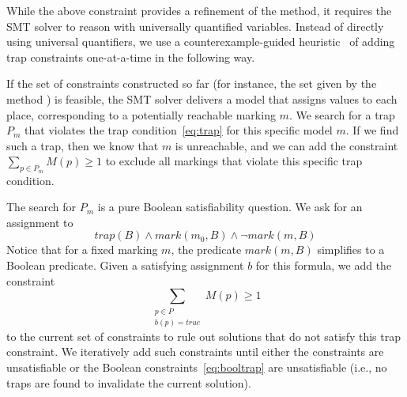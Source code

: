 While the above constraint provides a refinement of the \safety{} method, it
requires the SMT solver to reason with universally quantified variables.
Instead of directly using universal quantifiers, we use a counterexample-guided
heuristic~\cite{EsparzaMelzer00,Solar-LezamaTBSS06} of adding trap constraints one-at-a-time in
the following way.

If the set of constraints constructed so far (for instance, the set
given by the method \safety) is feasible, the SMT solver delivers a
model that assigns values to each place, corresponding to a potentially reachable marking $m$.  
We search for a trap $P_m$ that violates the trap condition~\eqref{eq:trap} for this specific model $m$.
If we find such a trap, then we know that $m$ is unreachable, and we can
add the constraint $\sum_{p \in P_m} M(p) \geq 1$ to exclude all markings that violate
this specific trap condition.

The search for $P_m$ is a pure Boolean satisfiability question.
We ask for an assignment to 
\begin{equation}\label{eq:booltrap}
\mathit{trap}(B) \wedge \mathit{mark}(m_0,B) \wedge \lnot \mathit{mark}(m, B)
\end{equation}
Notice that for a fixed marking $m$, the predicate $\mathit{mark}(m,B)$ simplifies
to a Boolean predicate.
Given a satisfying assignment $b$ for this formula, we add the constraint
\begin{equation}\label{eq:trapcons}
\sum_{\substack{p \in P \\ b(p) = true}}\!\!\!\!\!\! M(p) \geq 1
\end{equation} 
to the current set of constraints to rule out solutions that
do not satisfy this trap constraint.
We iteratively add such constraints until either the constraints are unsatisfiable
or the Boolean constraints~\eqref{eq:booltrap} are unsatisfiable (i.e., no traps are found
to invalidate the current solution). 
% 
% 
 
